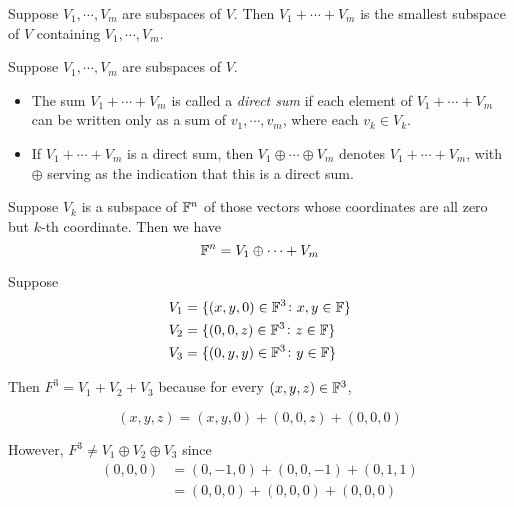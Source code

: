 \documentclass{extarticle}
\begin{document}
\begin{lemma}
    Suppose \(V_1, \cdots, V_m\) are subspaces of \(V\). Then \(V_1 + \cdots +V_m\)
    is the smallest subspace of \(V\) containing \(V_1, \cdots, V_m\).
\end{lemma}

\begin{definition}
    Suppose \(V_1, \cdots, V_m\) are subspaces of \(V\). 
    \begin{itemize}
        \item The sum \(V_1 + \cdots + V_m\) is called a \emph{direct sum} if 
        each element of \(V_1 + \cdots + V_m\) can be written only as a sum 
        of \(v_1, \cdots, v_m\), where each \(v_k \in V_k\). 
        \item If \(V_1 + \cdots + V_m\) is a direct sum, then \(V_1 \oplus \cdots \oplus V_m\)
        denotes \(V_1 + \cdots + V_m\), with \(\oplus\) serving as the 
        indication that this is a direct sum. 
    \end{itemize}
\end{definition}

\begin{example}
    Suppose \(V_k\) is a subspace of \(\mathbb{F}^n\) of those vectors whose coordinates
are all zero but \(k\)-th coordinate. Then we have 
\[\mathbb{F}^n = V_1 \oplus \cdots + V_m\]
\end{example}

\begin{example}
    Suppose 
    \begin{align*}
        & V_1 = \{(x, y, 0) \in \mathbb{F}^3 \colon  x, y \in \mathbb{F}\} \\ 
        & V_2 = \{(0, 0, z) \in \mathbb{F}^3 \colon z \in \mathbb{F}\} \\ 
        & V_3 = \{(0, y, y) \in \mathbb{F}^3 \colon y \in \mathbb{F}\}
    \end{align*}

    Then \(F^3 = V_1 + V_2 + V_3\) because for every \((x, y, z) \in \mathbb{F}^3\), 

    \[(x, y, z) = (x, y, 0) + (0, 0, z) + (0, 0, 0)\]

    However, \(F^3 \neq V_1 \oplus V_2 \oplus V_3\) since 
    \begin{align*}
        (0, 0, 0) &= (0, -1, 0) + (0, 0, -1) + (0, 1, 1) \\ 
        &= (0, 0, 0) + (0, 0, 0) + (0, 0, 0)
    \end{align*}
\end{example}
\end{document}
